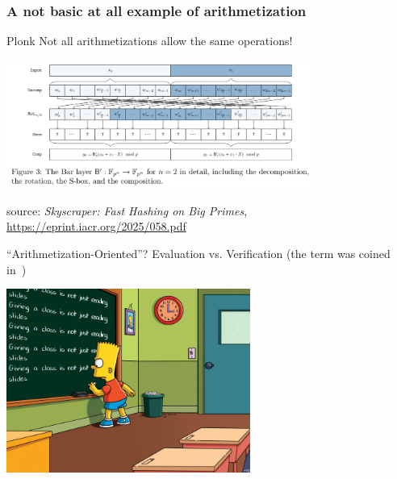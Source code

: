 \documentclass[presentation,aspectratio=1610]{beamer}
\begin{document}
\begin{frame}
  \frametitle{A not basic at all example of arithmetization}
  
  \begin{exampleblock}{Plonk}
    Not all arithmetizations allow the same operations!
  \end{exampleblock}
  
  \begin{center}
    \includegraphics[width=10cm]{./figures/skyscraper}

    \vspace{0.5cm}

    {source: \emph{Skyscraper: Fast Hashing on Big Primes}, \url{https://eprint.iacr.org/2025/058.pdf}}
  \end{center}
\end{frame}


\begin{frame}{``Arithmetization-Oriented''? Evaluation vs. Verification}
  (the term was coined in~\cite{ToSC:AABDS20})
  
  \vfill

  \begin{center}
    \includegraphics[width=8cm]{./figures/simpsons}
  \end{center}
  
  \vfill

\end{frame}
\end{document}
